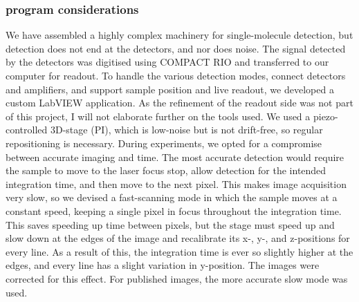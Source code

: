     \subsubsection{program considerations}
    \label{sec:program}
        We have assembled a highly complex machinery for single-molecule detection, but detection does not end at the detectors, and nor does noise. The signal detected by the detectors was digitised using COMPACT RIO and transferred to our computer for readout. To handle the various detection modes, connect detectors and amplifiers, and support sample position and live readout, we developed a custom LabVIEW application. As the refinement of the readout side was not part of this project, I will not elaborate further on the tools used. We used a piezo-controlled 3D-stage (PI), which is low-noise but is not drift-free, so regular repositioning is necessary. During experiments, we opted for a compromise between accurate imaging and time. The most accurate detection would require the sample to move to the laser focus stop, allow detection for the intended integration time, and then move to the next pixel. This makes image acquisition very slow, so we devised a fast-scanning mode in which the sample moves at a constant speed, keeping a single pixel in focus throughout the integration time. This saves speeding up time between pixels, but the stage must speed up and slow down at the edges of the image and recalibrate its x-, y-, and z-positions for every line. As a result of this, the integration time is ever so slightly higher at the edges, and every line has a slight variation in y-position. The images were corrected for this effect. For published images, the more accurate slow mode was used. \\
